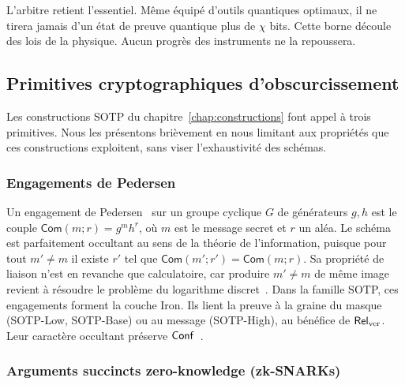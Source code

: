 \begin{boiteArbitre}
L'arbitre retient l'essentiel. Même équipé d'outils quantiques optimaux,
il ne tirera jamais d'un état de preuve quantique plus de $\chi$ bits.
Cette borne découle des lois de la physique. Aucun progrès
des instruments ne la repoussera.
\end{boiteArbitre}

\subsection{Primitives cryptographiques d'obscurcissement}
\label{subsec:primitives_crypto}
\begin{sloppypar}
Les constructions SOTP du
chapitre~\ref{chap:constructions} font appel \`a trois primitives. Nous les pr\'esentons
bri\`evement en nous limitant aux propri\'et\'es que ces constructions exploitent,
sans viser l'exhaustivit\'e des sch\'emas.

\subsubsection{Engagements de Pedersen}
\label{subsubsec:pedersen}

Un engagement de Pedersen~\cite{Pedersen91} sur un groupe cyclique $G$ de
g\'en\'erateurs $g, h$ est le couple $\mathsf{Com}(m; r) = g^m h^r$, o\`u $m$
est le message secret et $r$ un al\'ea. Le sch\'ema est parfaitement occultant au sens
de la th\'eorie de l'information, puisque pour tout $m' \neq m$ il existe $r'$ tel que
$\mathsf{Com}(m'; r') = \mathsf{Com}(m; r)$. Sa propri\'et\'e de liaison n'est en revanche
que calculatoire, car produire $m' \neq m$ de m\^eme image revient \`a r\'esoudre le probl\`eme
du logarithme discret~\cite{Schnorr91}. Dans la famille SOTP, ces engagements forment la couche Iron.
Ils lient la preuve \`a la graine du masque (SOTP-Low, SOTP-Base) ou au message (SOTP-High), au
b\'en\'efice de $\mathsf{Rel}_{\mathrm{ver}}$. Leur caract\`ere occultant pr\'eserve $\mathsf{Conf}$~\cite{ChaumPedersen92}.

\subsubsection{Arguments succincts zero-knowledge (zk-SNARKs)}
\label{subsubsec:zksnarks}


\end{sloppypar}
